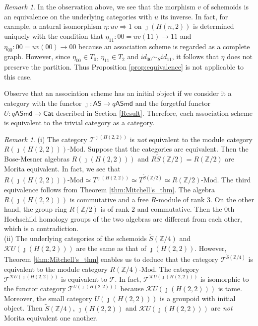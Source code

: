 \documentclass{amsart}
\theoremstyle{definition}
\theoremstyle{remark}
\newtheorem{rem}[thm]{Remark}
\newcommand{\K}{R}%
\newcommand{\T}{{\mathcal T}}
\begin{document}
\begin{rem}\label{rem:example_Hamming_one}
In the observation above, we see that the morphism $v$ of schemoids is an equivalence on the underlying categories with 
$u$ its inverse. In fact, for example, a natural isomorphism $\eta : uv \Rightarrow 1$ on $\jmath(H(n,2))$ 
is determined uniquely with the condition that 
$\eta_{11} : 00 =  uv(11) \to 11$ and  $\eta_{00} : 00 =  uv(00) \to 00$ because an association scheme is regarded as a complete graph. 
However, since $\eta_{00} \in T_0$, $\eta_{11}\in T_2$  and $id_{00}\sim_{S} id_{11}$, it follows that $\eta$ does not preserve 
the partition. Thus Proposition \ref{prop:equivalence} is not applicable to this case. 
  
Observe that an association scheme has an initial object if we consider it a category with the functor 
$\jmath : \mathsf{AS} \to q\mathsf{ASmd}$ and the forgetful functor $U : q\mathsf{ASmd} \to \mathsf{Cat}$ described in 
Section \ref{Result}. Therefore, each association scheme is equivalent to the trivial category as a category.  
\end{rem}

\begin{rem}\label{rem:example_equivalences}(i) The category $\T^{\jmath(H(2,2))}$ is {\it not} equivalent to the module category 
$\K(\jmath(H(2,2)))\text{-Mod}$. 
Suppose that the categories are equivalent. Then the Bose-Mesner algebras $\K(\jmath(H(2,2)))$ and  
$\K\widetilde{S}({\mathbb Z}/2) = \K({\mathbb Z}/2)$ are Morita equivalent. 
In fact, we see that  $\K(\jmath(H(2,2)))\text{-Mod}\simeq T^{\jmath(H(2,2))} \simeq 
T^{\widetilde{S}({\mathbb Z}/2)} \simeq \K({\mathbb Z}/2)\text{-Mod}$. The third equivalence follows from 
Theorem \ref{thm:Mitchell's_thm}. 
The algebra $\K(\jmath(H(2,2)))$ is commutative and a free $\K$-module of rank 
$3$.  On the other hand, the group ring $\K({\mathbb Z}/2)$ is of rank $2$ and commutative. 
Then the $0$th Hochschild homology groups of the two algebras are different from each other, which is a contradiction. \\  
(ii) The underlying categories of the schemoids $\widetilde{S}({\mathbb Z}/4)$ and $\mathcal{K}U(\jmath(H(2,2)))$ are 
the same as that of $\jmath(H(2,2))$. 
However, Theorem \ref{thm:Mitchell's_thm} enables us to deduce that the category $\T^{\widetilde{S}({\mathbb Z}/4)}$ is equivalent 
to the module category $\K({\mathbb Z}/4)\text{-Mod}$. 
The category $\T^{\mathcal{K}U(\jmath(H(2,2)))}$ is equivalent to $\T$. In fact, $\T^{\mathcal{K}U(\jmath(H(2,2)))}$ 
is isomorphic to the functor category 
$\T^{U(\jmath(H(2,2)))}$ because  ${\mathcal{K}U(\jmath(H(2,2)))}$ is tame. 
Moreover, the small category $U(\jmath(H(2,2)))$ is a groupoid with initial object.  
Then ${\widetilde{S}({\mathbb Z}/4)}$,  $\jmath(H(2,2))$ and $\mathcal{K}U(\jmath(H(2,2)))$ are {\it not} 
Morita equivalent one another.  
\end{rem}
\end{document}
